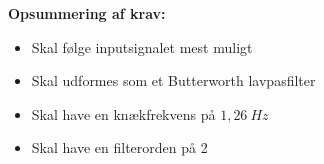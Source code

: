 %
%
%
%

\vspace{3mm}
\textbf{Opsummering af krav:}
\begin{itemize}
\item[\text{\sffamily \checkmark}] Skal følge inputsignalet mest muligt  
\item[\text{\sffamily \checkmark}] Skal udformes som et Butterworth lavpasfilter
\item[\text{\sffamily \checkmark}] Skal have en knækfrekvens på $1,26~Hz$
\item[\text{\sffamily \checkmark}] Skal have en filterorden på 2
\end{itemize}